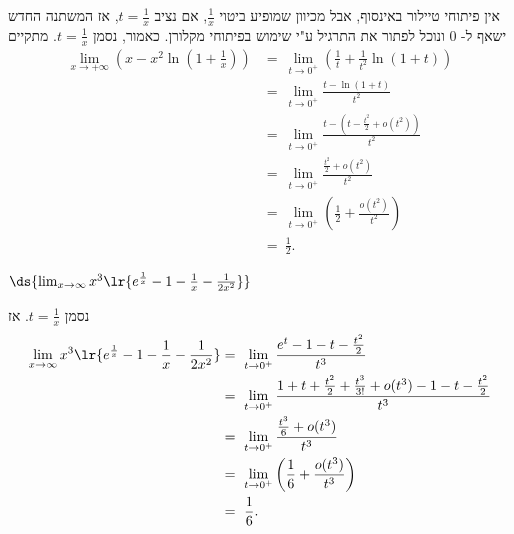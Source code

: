 \begin{solbox}
אין פיתוחי טיילור באינסוף, אבל מכיוון שמופיע ביטוי
$\frac{1}{x}$,
אם נציב
$t=\frac{1}{x}$,
אז המשתנה החדש ישאף ל-
$0$
ונוכל לפתור את התרגיל ע"י שימוש בפיתוחי מקלורן.
כאמור,
נסמן \(t=\frac1x\).
מתקיים
\begin{align*}
    \lim_{x \to +\infty} \left( x - x^2 \ln\left(1 + \frac{1}{x}\right) \right)&=\ \lim_{t\to0^+}\left(\frac{1}{t}+\frac{1}{t^2}\ln(1+t)\right)\\
    &=\ \lim_{t \to 0^+}\frac{t-\ln(1+t)}{t^2}\\
    &=\ \lim_{t \to 0^+}\frac{t-(t-\frac{t^2}{2}+o(t^2))}{t^2}\\
    &=\ \lim_{t \to 0^+}\frac{\frac{t^2}{2}+o(t^2)}{t^2}\\
    &=\ \lim_{t \to 0^+}\left(\frac{1}{2}+\frac{o(t^2)}{t^2}\right)\\
    &=\ \frac{1}{2}.
\end{align*}
\end{solbox}
\item $\ds{\lim_{x\to\infty}x^3\lr{e^{\frac1x}-1-\frac1x-\frac{1}{2x^2}}}$
\begin{solbox}
נסמן \(t=\frac1x\). אז
\begin{align*}
    \lim_{x\to\infty}x^3\lr{e^{\frac1x}-1-\frac1x-\frac{1}{2x^2}}&=\ \lim_{t\to0^+}\frac{e^t-1-t-\frac{t^2}{2}}{t^3}\\
    &=\ \lim_{t\to0^+}\frac{1+t+\frac{t^2}{2}+\frac{t^3}{3!}+o(t^3)-1-t-\frac{t^2}{2}}{t^3}\\
    &=\ \lim_{t\to0^+}\frac{\frac{t^3}{6}+o(t^3)}{t^3}\\
    &=\ \lim_{t\to0^+}\left(\frac{1}{6}+\frac{o(t^3)}{t^3}\right)\\
    &=\ \frac{1}{6}.
\end{align*}
\end{solbox}
\eMs
\eE
